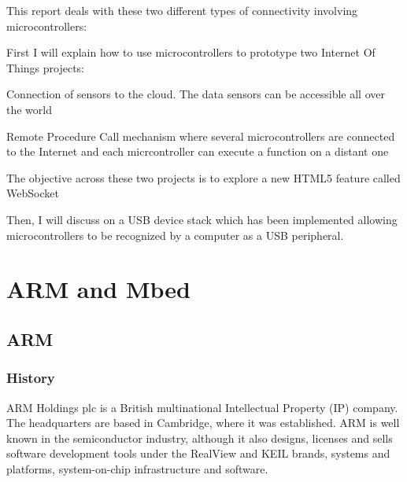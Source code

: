 \documentclass[pdftex,10pt,a4paper]{report}
\newenvironment{packed_item}{
\begin{itemize}
  \setlength{\itemsep}{1pt}
  \setlength{\parskip}{0pt}
  \setlength{\parsep}{0pt}
}{\end{itemize}}
\begin{document}
This report deals with these two different types of connectivity involving microcontrollers:
\begin{packed_item}
	\item First I will explain how to use microcontrollers to prototype two Internet Of Things projects:
	\begin{packed_item}
		\item Connection of sensors to the cloud. The data sensors can be accessible all over the world
		\item Remote Procedure Call mechanism where several microcontrollers are connected to the Internet and each micrcontroller can execute a function on a distant one
	\end{packed_item}
	The objective across these two projects is to explore a new HTML5 feature called WebSocket
	\item Then, I will discuss on a USB device stack which has been implemented allowing microcontrollers to be recognized by a computer as a USB peripheral.
\end{packed_item}

\tableofcontents

\chapter{ARM and Mbed}
\section{ARM}
\subsection{History}
ARM Holdings plc is a British multinational Intellectual Property (IP) company. The headquarters are based in Cambridge, where it was established. ARM is well known in the semiconductor industry, although it also designs, licenses and sells software development tools under the RealView and KEIL brands, systems and platforms, system-on-chip infrastructure and software. 
\\
\end{document}
